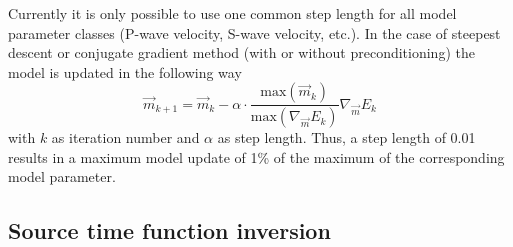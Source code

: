 \documentclass[pdftex,a4paper,parskip,listof=totoc,bibliography=totoc,onehalfspacing,12pt]{scrreprt}
\begin{document}
Currently it is only possible to use one common step length for all model parameter classes (P-wave velocity, S-wave velocity, etc.). In the case of steepest descent or conjugate gradient method (with or without preconditioning) the model is updated in the following way
\begin{equation}
 \vec{m}_{k+1} = \vec{m}_k - \alpha \cdot \frac{\mathrm{max}(\vec{m}_k)}{\mathrm{max}(\nabla_{\vec{m}} E_k)} \nabla_{\vec{m}} E_k   
\end{equation}
with $k$ as iteration number and $\alpha$ as step length. Thus, a step length of 0.01 results in a maximum model update of 1\% of the maximum of the corresponding model parameter.

\subsection{Source time function inversion}
\end{document}

